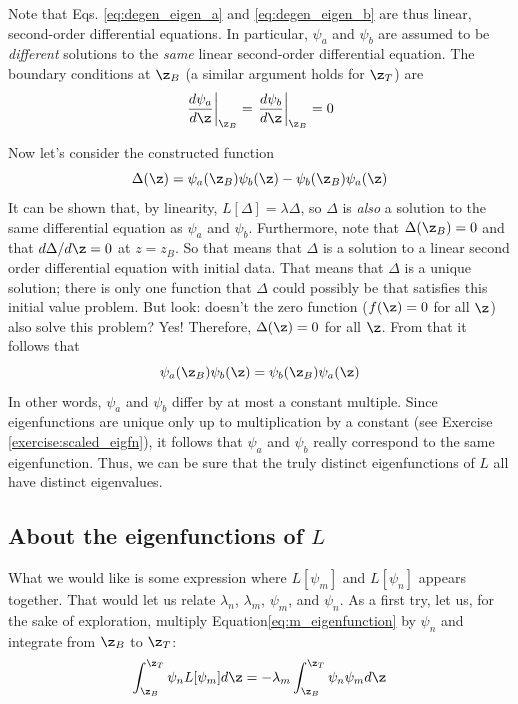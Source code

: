 Note that Eqs. \ref{eq:degen_eigen_a} and \ref{eq:degen_eigen_b} are thus linear, second-order differential equations. In particular, $\psi_a$ and $\psi_b$ are assumed to be \textit{different} solutions to the \textit{same} linear second-order differential equation. The boundary conditions at $\z_B$ (a similar argument holds for $\z_T$) are
\begin{equation}
  \left.\frac{d\psi_a}{d\z}\right|_{\z_B} = \left.\frac{d\psi_b}{d\z}\right|_{\z_B} = 0
\end{equation}

Now let's consider the constructed function
\begin{equation}
  \Delta(\z) = \psi_a(\z_B)\psi_b(\z)-\psi_b(\z_B)\psi_a(\z)
\end{equation}
It can be shown that, by linearity, $L[\Delta]=\lambda\Delta$, so $\Delta$ is \textit{also} a solution to the same differential equation as $\psi_a$ and $\psi_b$. Furthermore, note that $\Delta(\z_B)=0$ and that $d\Delta/d\z=0$ at $z=z_B$. So that means that $\Delta$ is a solution to a linear second order differential equation with initial data. That means that $\Delta$ is a unique solution; there is only one function that $\Delta$ could possibly be that satisfies this initial value problem. But look: doesn't the zero function ($f(\z)=0$ for all $\z$) also solve this problem? Yes! Therefore, $\Delta(\z)=0$ for all $\z$. From that it follows that
\begin{equation}
  \psi_a(\z_B)\psi_b(\z) = \psi_b(\z_B)\psi_a(\z)
\end{equation}
In other words, $\psi_a$ and $\psi_b$ differ by at most a constant multiple. Since eigenfunctions are unique only up to multiplication by a constant (see Exercise \ref{exercise:scaled_eigfn}), it follows that $\psi_a$ and $\psi_b$ really correspond to the same eigenfunction. Thus, we can be sure that the truly distinct eigenfunctions of $L$ all have distinct eigenvalues. 



\subsection{About the eigenfunctions of $L$}
What we would like is some expression where $L[\psi_m]$ and $L[\psi_n]$ appears together. That would let us relate $\lambda_n$, $\lambda_m$, $\psi_m$, and $\psi_n$. As a first try, let us, for the sake of exploration, multiply Equation\ref{eq:m_eigenfunction} by $\psi_n$ and integrate from $\z_B$ to $\z_T$:
\begin{equation}
    \label{eq:first_try}
  \int_{\z_B}^{\z_T}\psi_nL[\psi_m] d\z = -\lambda_m\int_{\z_B}^{\z_T}\psi_n\psi_m d\z
\end{equation}

